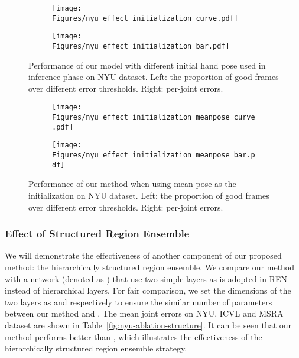 \documentclass[final, 5p]{elsarticle}
\begin{document}
\begin{figure*}[!tb]
  \centering
  \begin{subfigure}[t]{0.5\textwidth}
    \centering
    \centerline{\texttt{[image: Figures/nyu\_effect\_initialization\_curve.pdf]}}
  \end{subfigure}\begin{subfigure}[t]{0.5\textwidth}
    \centering
    \centerline{\texttt{[image: Figures/nyu\_effect\_initialization\_bar.pdf]}}
  \end{subfigure}\caption{Performance of our model with different initial hand pose used in inference phase on NYU dataset. Left: the proportion of good frames
over different error thresholds. Right: per-joint errors.}
\label{fig:nyu-ablation-initialization}
\end{figure*}

\begin{figure*}[!tb]
  \centering
  \begin{subfigure}[t]{0.5\textwidth}
    \centering
    \centerline{\texttt{[image: Figures/nyu\_effect\_initialization\_meanpose\_curve.pdf]}}
  \end{subfigure}\begin{subfigure}[t]{0.5\textwidth}
    \centering
    \centerline{\texttt{[image: Figures/nyu\_effect\_initialization\_meanpose\_bar.pdf]}}
  \end{subfigure}\caption{Performance of our method when using mean pose as the initialization on NYU dataset. Left: the proportion of good frames
over different error thresholds. Right: per-joint errors.}
\label{fig:nyu-ablation-initialization-meanpose}
\end{figure*}

\subsubsection{Effect of Structured Region Ensemble}
We will demonstrate the effectiveness of another component of our proposed method: the hierarchically structured region ensemble. We compare our method with a network (denoted as ) that use two simple  layers as is adopted in REN~\cite{guo2017region} instead of hierarchical  layers. For fair comparison, we set the dimensions of the two  layers as  and  respectively to ensure the similar number of parameters between our method and . The mean joint errors on NYU, ICVL and MSRA dataset are shown in Table~\ref{fig:nyu-ablation-structure}. It can be seen that our method performs better than , which illustrates the effectiveness of the hierarchically structured region ensemble strategy.
\end{document}
